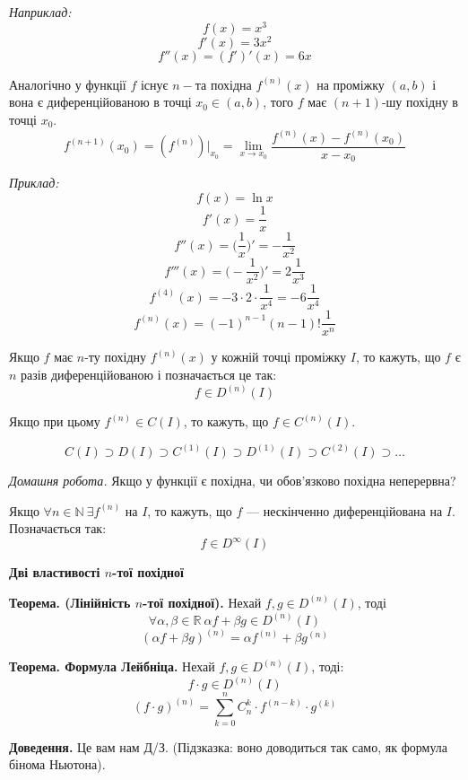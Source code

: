 \documentclass[12pt]{report}
\begin{document}
\textit{Наприклад:}
$$f(x) = x^3$$
$$f'(x) = 3 x^2$$
$$f''(x) = (f')'(x) = 6x$$

Аналогічно у функції $f$ існує $n-$та  похідна $f^{(n)}(x)$ на проміжку $(a,b)$ і вона є диференційованою в точці $x_0 \in (a,b)$, того
$f$ має $(n+1)$-шу похідну в точці $x_0$.
$$f^{(n+1)}(x_0) = (f^{(n)})|_{x_0} = \lim_{x\to x_0}\frac{f^{(n)}(x) - f^{(n)}(x_0)}{x - x_0}$$

\textit{Приклад:}
$$f(x) = \ln x$$
$$f'(x) = \frac{1}{x}$$
$$f''(x) = \Big( \frac{1}{x} \Big)' = -\frac{1}{x^2}$$
$$f'''(x) = \Big( -\frac{1}{x^2} \Big)' = 2\frac{1}{x^3}$$
$$f^{(4)}(x) = -3 \cdot 2 \cdot \frac{1}{x^4} = -6 \frac{1}{x^4}$$
$$f^{(n)}(x) = (-1)^{n-1}(n-1)!\frac{1}{x^n}$$

Якщо $f$ має $n$-ту похідну $f^{(n)}(x)$ у кожній точці проміжку $I$, то кажуть, що $f$ є $n$ разів диференційованою і позначається це так:
$$f \in D^{(n)}(I)$$

Якщо при цьому $f^{(n)} \in C(I)$, то кажуть, що $f \in C^{(n)}(I)$.

$$C(I) \supset D(I) \supset C^{(1)}(I) \supset D^{(1)}(I) \supset C^{(2)}(I) \supset \ldots$$

\textit{Домашня робота.} Якщо у функції є похідна, чи обов'язково похідна неперервна?

\vspace{3mm}

Якщо $\forall n \in \mathbb{N}\ \exists f^{(n)}$ на $I$, то кажуть, що $f$ --- нескінченно диференційована на $I$. Позначається так:
$$f \in D^{\infty}(I)$$

\begin{center}

\textbf{\large{Дві властивості $n$-тої похідної}}

\end{center}

\textbf{Теорема. (Лінійність $n$-тої похідної).} Нехай $f,g \in D^{(n)}(I)$, тоді 
$$\forall \alpha, \beta \in \mathbb{R}\ \alpha f  +\beta g \in D^{(n)}(I)$$
$$(\alpha f + \beta g)^{(n)} = \alpha f^{(n)} + \beta g^{(n)}$$

\textbf{Теорема. Формула Лейбніца.} Нехай $f,g \in D^{(n)}(I)$, тоді: 
$$f \cdot g \in D^{(n)}(I)$$
$$(f \cdot g)^{(n)} = \sum_{k = 0}^{n} C_n^k \cdot f^{(n-k)} \cdot g^{(k)}$$

\textbf{Доведення.} Це вам нам Д/З. (Підзказка: воно доводиться так само, як формула бінома Ньютона).

\vspace{3mm}
\end{document}

